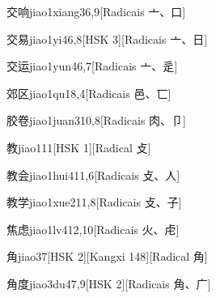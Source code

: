 \begin{entry}{交响}{jiao1xiang3}{6,9}[Radicais ⼇、⼝]
\end{entry}

\begin{entry}{交易}{jiao1yi4}{6,8}[HSK 3][Radicais ⼇、⽇]
\end{entry}

\begin{entry}{交运}{jiao1yun4}{6,7}[Radicais ⼇、⾡]
\end{entry}

\begin{entry}{郊区}{jiao1qu1}{8,4}[Radicais ⾢、⼖]
\end{entry}

\begin{entry}{胶卷}{jiao1juan3}{10,8}[Radicais ⾁、⼙]
\end{entry}

\begin{entry}{教}{jiao1}{11}[HSK 1][Radical ⽁]
\end{entry}

\begin{entry}{教会}{jiao1hui4}{11,6}[Radicais ⽁、⼈]
\end{entry}

\begin{entry}{教学}{jiao1xue2}{11,8}[Radicais ⽁、⼦]
\end{entry}

\begin{entry}{焦虑}{jiao1lv4}{12,10}[Radicais ⽕、⾌]
\end{entry}

\begin{entry}{角}{jiao3}{7}[HSK 2][Kangxi 148][Radical ⾓]
\end{entry}

\begin{entry}{角度}{jiao3du4}{7,9}[HSK 2][Radicais ⾓、⼴]
\end{entry}

